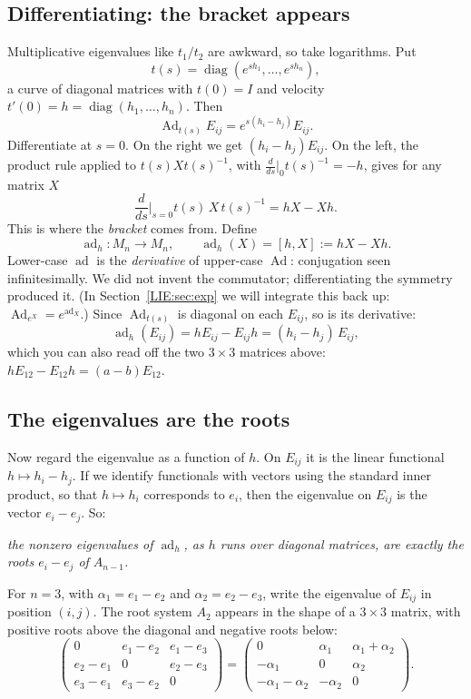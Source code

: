 \subsection*{Differentiating: the bracket appears}
Multiplicative eigenvalues like $t_1/t_2$ are awkward, so take logarithms. Put
\[
  t(s)=\operatorname{diag}(e^{sh_1},\dots,e^{sh_n}),
\]
a curve of diagonal matrices with $t(0)=I$ and velocity $t'(0)=h=\operatorname{diag}(h_1,\dots,h_n)$. Then
\[
  \operatorname{Ad}_{t(s)}E_{ij}=e^{s(h_i-h_j)}E_{ij}.
\]
Differentiate at $s=0$. On the right we get $(h_i-h_j)E_{ij}$. On the left, the product rule applied
to $t(s)Xt(s)^{-1}$, with $\frac{d}{ds}\big|_0t(s)^{-1}=-h$, gives for any matrix $X$
\[
  \frac{d}{ds}\Big|_{s=0}t(s)\,X\,t(s)^{-1}=hX-Xh .
\]
This is where the \emph{bracket} comes from. Define
\[
  \operatorname{ad}_h\colon M_n\to M_n,\qquad \operatorname{ad}_h(X)=[h,X]:=hX-Xh .
\]
Lower-case $\operatorname{ad}$ is the \emph{derivative} of upper-case $\operatorname{Ad}$: conjugation
seen infinitesimally. We did not invent the commutator; differentiating the symmetry produced it. (In
Section~\ref{LIE:sec:exp} we will integrate this back up: $\operatorname{Ad}_{e^X}=e^{\operatorname{ad}_X}$.)
Since $\operatorname{Ad}_{t(s)}$ is diagonal on each $E_{ij}$, so is its derivative:
\[
  \operatorname{ad}_h(E_{ij})=hE_{ij}-E_{ij}h=(h_i-h_j)\,E_{ij},
\]
which you can also read off the two $3\times3$ matrices above: $hE_{12}-E_{12}h=(a-b)E_{12}$.

\subsection*{The eigenvalues are the roots}
Now regard the eigenvalue as a function of $h$. On $E_{ij}$ it is the linear functional
$h\mapsto h_i-h_j$. If we identify functionals with vectors using the standard inner product, so that
$h\mapsto h_i$ corresponds to $e_i$, then the eigenvalue on $E_{ij}$ is the vector $e_i-e_j$. So:
\begin{center}
\emph{the nonzero eigenvalues of $\operatorname{ad}_h$, as $h$ runs over diagonal matrices, are exactly
the roots $e_i-e_j$ of $A_{n-1}$.}
\end{center}
For $n=3$, with $\alpha_1=e_1-e_2$ and $\alpha_2=e_2-e_3$, write the eigenvalue of $E_{ij}$ in position
$(i,j)$. The root system $A_2$ appears in the shape of a $3\times 3$ matrix, with positive roots above the
diagonal and negative roots below:
\[
  \begin{pmatrix}0&e_1-e_2&e_1-e_3\\ e_2-e_1&0&e_2-e_3\\ e_3-e_1&e_3-e_2&0\end{pmatrix}
  =\begin{pmatrix}0&\alpha_1&\alpha_1+\alpha_2\\ -\alpha_1&0&\alpha_2\\ -\alpha_1-\alpha_2&-\alpha_2&0\end{pmatrix}.
\]

